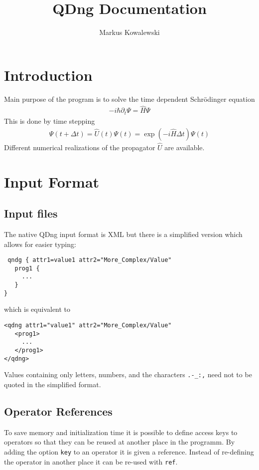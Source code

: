 \documentclass[a4paper,12pt]{scrbook}
\title{QDng Documentation}
\author{Markus Kowalewski}
\begin{document}
\maketitle

\tableofcontents

\chapter{Introduction}
Main purpose of the program is to solve
the time dependent Schr\"odinger equation
\begin{align}
-i\hbar \partial_t \Psi = \hat H \Psi
\end{align}
This is done by time stepping
\begin{align}
\Psi(t+\Delta t) = \hat U(t) \Psi(t) = \exp\left(-i\hat H \Delta t \right) \Psi(t)
\end{align}
Different numerical realizations of the propagator
$\hat U$ are available.



\chapter{Input Format}
\section{Input files}
The native QDng input format is XML but there is a simplified version which allows
for easier typing:
\begin{verbatim}
 qndg { attr1=value1 attr2="More_Complex/Value"
   prog1 {
     ...
   }
}
\end{verbatim}
which is equivalent to
\begin{verbatim}
<qdng attr1="value1" attr2="More_Complex/Value"
   <prog1>
     ...
   </prog1>
</qdng>
\end{verbatim}
Values containing only letters, numbers, and the characters \verb|.-_:,| need not to
be quoted in the simplified format.

\section{Operator References}
To save memory and initialization time it is possible to define access keys to operators
so that they can be reused at another place in the programm. By adding the option \verb|key|
to an operator it is given a reference. Instead of re-defining the operator in another place
it can be re-used with \verb|ref|.
\end{document}
